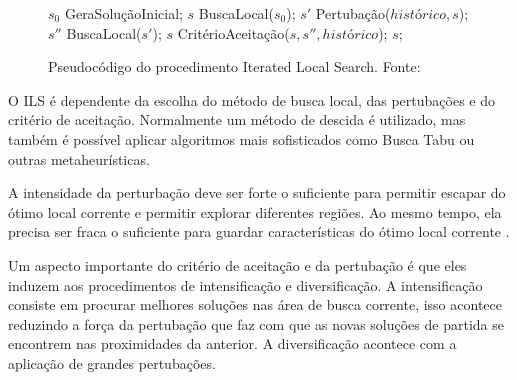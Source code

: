 \begin{figure}[h]
\caption{Pseudocódigo do procedimento Iterated Local Search. \mbox{Fonte:
\cite{notasmarcone}}}\label{alg:ils}
\begin{programma}
\STATE $s_{0}$ \GETS GeraSoluçãoInicial;
\STATE $s$ \GETS BuscaLocal($s_{0}$);
\STATE $s{'}$ \GETS Pertubação($histórico, s$);
\STATE $s{''}$ \GETS BuscaLocal($s{'}$);
\STATE $s$ \GETS CritérioAceitação($s, s{''}, histórico$);
\ENDWHILE
\STATE\RETURN $s$;
\ENDALGORITHM
\end{programma}
\end{figure}

O ILS é dependente da escolha do método de busca local, das pertubações e do critério de aceitação. Normalmente um método de descida é utilizado, mas também é possível aplicar algoritmos mais sofisticados como Busca Tabu ou outras metaheurísticas.

A intensidade da perturbação deve ser forte o suficiente para permitir escapar do ótimo
local corrente e permitir explorar diferentes regiões. Ao mesmo tempo, ela precisa ser fraca
o suficiente para guardar características do ótimo local corrente \cite{notasmarcone}.

Um aspecto importante do critério de aceitação e da pertubação é que eles induzem aos procedimentos de intensificação e diversificação. A intensificação consiste em procurar melhores soluções nas área de busca corrente, isso acontece reduzindo a força da pertubação que faz com que as novas soluções de partida se encontrem nas proximidades da anterior. A diversificação acontece com a aplicação de grandes pertubações.

